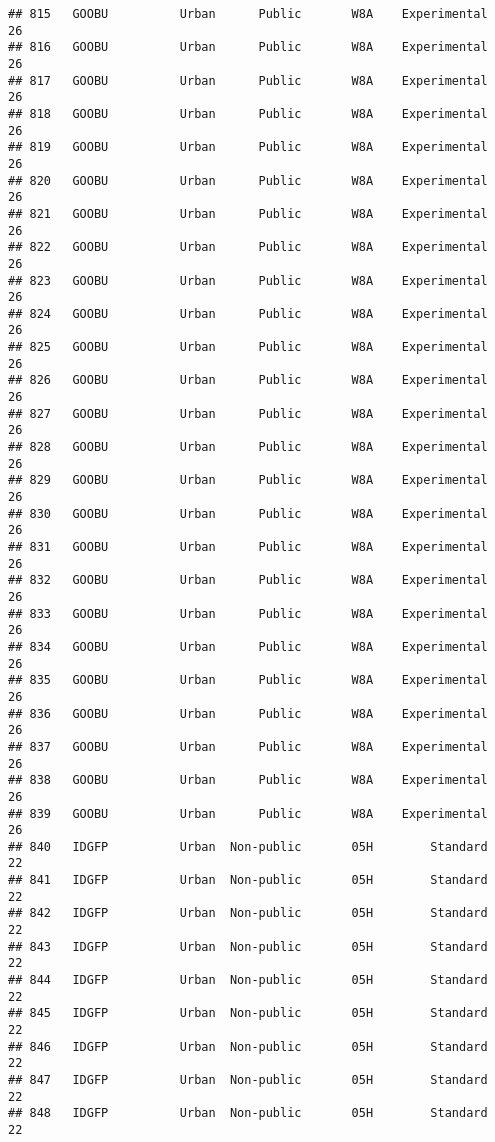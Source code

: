 \documentclass[
]{article}
\begin{document}
\begin{verbatim}
## 815   GOOBU          Urban      Public       W8A    Experimental        26
## 816   GOOBU          Urban      Public       W8A    Experimental        26
## 817   GOOBU          Urban      Public       W8A    Experimental        26
## 818   GOOBU          Urban      Public       W8A    Experimental        26
## 819   GOOBU          Urban      Public       W8A    Experimental        26
## 820   GOOBU          Urban      Public       W8A    Experimental        26
## 821   GOOBU          Urban      Public       W8A    Experimental        26
## 822   GOOBU          Urban      Public       W8A    Experimental        26
## 823   GOOBU          Urban      Public       W8A    Experimental        26
## 824   GOOBU          Urban      Public       W8A    Experimental        26
## 825   GOOBU          Urban      Public       W8A    Experimental        26
## 826   GOOBU          Urban      Public       W8A    Experimental        26
## 827   GOOBU          Urban      Public       W8A    Experimental        26
## 828   GOOBU          Urban      Public       W8A    Experimental        26
## 829   GOOBU          Urban      Public       W8A    Experimental        26
## 830   GOOBU          Urban      Public       W8A    Experimental        26
## 831   GOOBU          Urban      Public       W8A    Experimental        26
## 832   GOOBU          Urban      Public       W8A    Experimental        26
## 833   GOOBU          Urban      Public       W8A    Experimental        26
## 834   GOOBU          Urban      Public       W8A    Experimental        26
## 835   GOOBU          Urban      Public       W8A    Experimental        26
## 836   GOOBU          Urban      Public       W8A    Experimental        26
## 837   GOOBU          Urban      Public       W8A    Experimental        26
## 838   GOOBU          Urban      Public       W8A    Experimental        26
## 839   GOOBU          Urban      Public       W8A    Experimental        26
## 840   IDGFP          Urban  Non-public       05H        Standard        22
## 841   IDGFP          Urban  Non-public       05H        Standard        22
## 842   IDGFP          Urban  Non-public       05H        Standard        22
## 843   IDGFP          Urban  Non-public       05H        Standard        22
## 844   IDGFP          Urban  Non-public       05H        Standard        22
## 845   IDGFP          Urban  Non-public       05H        Standard        22
## 846   IDGFP          Urban  Non-public       05H        Standard        22
## 847   IDGFP          Urban  Non-public       05H        Standard        22
## 848   IDGFP          Urban  Non-public       05H        Standard        22

\end{verbatim}
\end{document}
